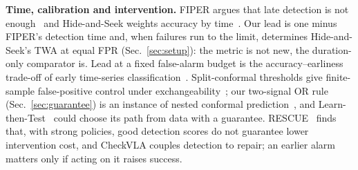 \textbf{Time, calibration and intervention.}
FIPER argues that late detection is not enough~\cite{romer2025fiper} and Hide-and-Seek weights
accuracy by time~\cite{park2026hideseek}. Our lead is one minus FIPER's detection time and, when
failures run to the limit, determines Hide-and-Seek's TWA at equal FPR (Sec.~\ref{sec:setup}): the
metric is not new, the duration-only comparator is. Lead at a fixed false-alarm budget is the
accuracy--earliness trade-off of early time-series classification~\cite{xing2012early}.
Split-conformal thresholds give finite-sample
false-positive control under exchangeability~\cite{angelopoulos2021gentle}; our two-signal OR
rule (Sec.~\ref{sec:guarantee}) is an instance of nested conformal
prediction~\cite{gupta2022nested}, and Learn-then-Test~\cite{angelopoulos2025ltt} could choose
its path from data with a guarantee. RESCUE~\cite{ahmedt2026rescue}
finds that, with strong policies, good detection scores do not guarantee lower intervention
cost, and CheckVLA
couples detection to repair; an earlier alarm matters only if acting
on it raises success.
